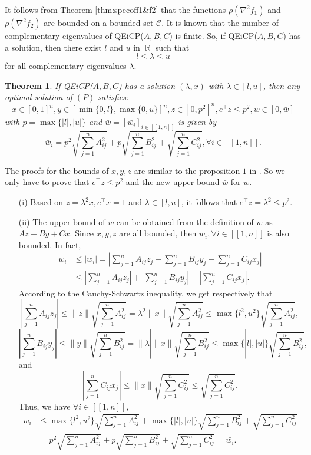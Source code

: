 \documentclass[3p]{elsarticle}
\DeclareMathOperator{\R}{\mathbb{R}}
\newcommand{\IntEnt}[1]{\left[\!\left[#1\right]\!\right]}
\newtheorem{thm}{Theorem}
\begin{document}
It follows from Theorem \ref{thm:specoff1&f2} that the functions $\rho(\nabla^2 f_1)$ and $\rho(\nabla^2 f_2)$ are bounded on a bounded set $\mathcal{C}$. It is known \cite{Fernandes14} that the number of complementary eigenvalues of QEiCP($A,B,C$) is finite. So, if QEiCP($A,B,C$) has a solution, then there exist $l$ and $u$ in $\R$ such that $$l\leq \lambda\leq u$$
for all complementary eigenvalues $\lambda$.
\begin{thm}\label{thm:boundsofvars}
	If QEiCP($A,B,C$) has a solution $(\lambda, x)$ with $\lambda\in [l,u]$, then any optimal solution of $(P)$ satisfies:
	\[x\in [0,1]^n, y\in [\min\{0,l\},\max\{0,u\}]^n, z\in [0,p^2]^n, e^{\top}z\leq p^2, w\in [0,\bar{w}]\]
	with $p = \max\{|l|,|u|\}$ and $\bar{w}=[\bar{w_i}]_{i\in \IntEnt{1,n}}$ is given by \[\bar{w}_i=p^2\sqrt{\sum_{j=1}^{n}A_{ij}^2} + p\sqrt{\sum_{j=1}^{n}B_{ij}^2} +  \sqrt{\sum_{j=1}^{n}C_{ij}^2}, \forall i \in \IntEnt{1,n}.
	\]
\end{thm}
\begin{pf} The proofs for the bounds of $x,y,z$ are similar to the proposition $1$ in \cite{Niu15}. So we only have to prove that $e^{\top}z\leq p^2$ and the new upper bound $\bar{w}$ for $w$. 
	\begin{enumerate}
		\item[(i)] Based on $z=\lambda^2x, e^{\top}x=1$ and $\lambda \in [l,u]$, it follows that $e^{\top}z=\lambda^2\leq p^2$.
		\item[(ii)] The upper bound of $w$ can be obtained from the definition of $w$ as $Az+By+Cx$. Since $x,y,z$ are all bounded, then $w_i, \forall i\in \IntEnt{1,n}$ is also bounded. In fact,
		\begin{align}
		w_i &\leq |w_i| = \left|\sum_{j=1}^{n}A_{ij}z_j + \sum_{j=1}^{n}B_{ij}y_j + \sum_{j=1}^{n}C_{ij}x_j \right|\nonumber\\
		&\leq \left|\sum_{j=1}^{n}A_{ij}z_j\right| + \left|\sum_{j=1}^{n}B_{ij}y_j\right| + \left|\sum_{j=1}^{n}C_{ij}x_j \right|.\nonumber
		\end{align}
		According to the Cauchy-Schwartz inequality, we get respectively that
		\[\left|\sum_{j=1}^{n}A_{ij}z_j\right| \leq \|z\|\sqrt{\sum_{j=1}^{n}A_{ij}^2}=\lambda^2\|x\|\sqrt{\sum_{j=1}^{n}A_{ij}^2}\leq \max\{l^2,u^2\}\sqrt{\sum_{j=1}^{n}A_{ij}^2},\]
		\[\left|\sum_{j=1}^{n}B_{ij}y_j\right| \leq \|y\|\sqrt{\sum_{j=1}^{n}B_{ij}^2}=\|\lambda|\|x\|\sqrt{\sum_{j=1}^{n}B_{ij}^2}\leq \max\{|l|,|u|\}\sqrt{\sum_{j=1}^{n}B_{ij}^2},\]
		and 
		\[\left|\sum_{j=1}^{n}C_{ij}x_j\right| \leq \|x\|\sqrt{\sum_{j=1}^{n}C_{ij}^2}\leq \sqrt{\sum_{j=1}^{n}C_{ij}^2}.\]
		Thus, we have $\forall i\in \IntEnt{1,n}$, 
		\begin{align}
		w_i &\leq \max\{l^2,u^2\}\sqrt{\sum_{j=1}^{n}A_{ij}^2} + \max\{|l|,|u|\}\sqrt{\sum_{j=1}^{n}B_{ij}^2} +  \sqrt{\sum_{j=1}^{n}C_{ij}^2}\nonumber\\
		&=p^2\sqrt{\sum_{j=1}^{n}A_{ij}^2} + p\sqrt{\sum_{j=1}^{n}B_{ij}^2} +  \sqrt{\sum_{j=1}^{n}C_{ij}^2} = \bar{w_i}.\nonumber
		\end{align}
	\end{enumerate}
\end{pf}
\end{document}

